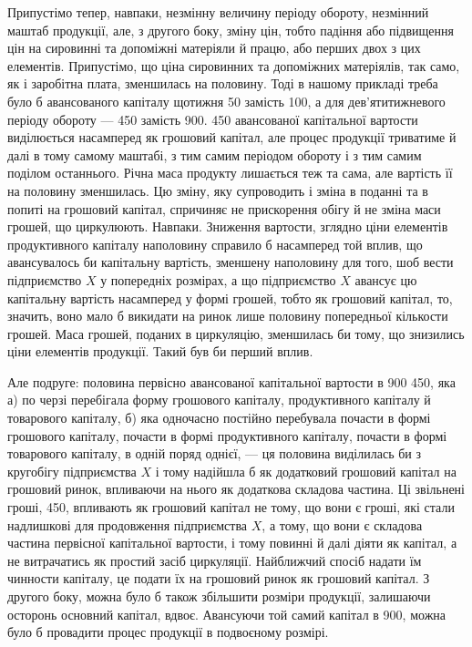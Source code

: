 \parcont{}  %
Припустімо тепер, навпаки, незмінну величину періоду обороту, незмінний
маштаб продукції, але, з другого боку, зміну цін, тобто падіння або
підвищення цін на сировинні та допоміжні матеріяли й працю, або перших
двох з цих елементів. Припустімо, що ціна сировинних та допоміжних
матеріялів, так само, як і заробітна плата, зменшилась на половину.
Тоді в нашому прикладі треба було б авансованого капіталу щотижня
50 замість 100, а для дев'ятитижневого періоду обороту — 450 замість 900. 450 авансованої капітальної
вартости виділюється насамперед як грошовий капітал, але процес продукції
триватиме й далі в тому самому маштабі, з тим самим періодом
обороту і з тим самим поділом останнього. Річна маса продукту лишається
теж та сама, але вартість її на половину зменшилась. Цю зміну, яку
супроводить і зміна в поданні та в попиті на грошовий капітал, спричиняє
не прискорення обігу й не зміна маси грошей, що циркулюють. Навпаки.
Зниження вартости, зглядно ціни елементів продуктивного капіталу
наполовину справило б насамперед той вплив, що авансувалось би капітальну
вартість, зменшену наполовину для того, шоб вести підприємство
$X$ у попередніх розмірах, а що підприємство $X$ авансує цю капітальну
вартість насамперед у формі грошей, тобто як грошовий капітал,
то, значить, воно мало б викидати на ринок лише половину попередньої
кількости грошей. Маса грошей, поданих в циркуляцію, зменшилась би
тому, що знизились ціни елементів продукції. Такий був би перший вплив.

Але подруге: половина первісно авансованої капітальної вартости в
900 \deq{} 450, яка а) по черзі перебігала форму грошового
капіталу, продуктивного капіталу й товарового капіталу, б) яка одночасно
постійно перебувала почасти в формі грошового капіталу, почасти
в формі продуктивного капіталу, почасти в формі товарового капіталу,
в одній поряд однієї, — ця половина виділилась би з
кругобігу підприємства $X$ і тому надійшла б як додатковий грошовий
капітал на грошовий ринок, впливаючи на нього як додаткова складова
частина. Ці звільнені гроші, 450, впливають як грошовий капітал
не тому, що вони є гроші, які стали надлишкові для продовження
підприємства $X$, а тому, що вони є складова частина первісної капітальної
вартости, і тому повинні й далі діяти як капітал, а не витрачатись як
простий засіб циркуляції. Найближчий спосіб надати їм чинности капіталу,
це подати їх на грошовий ринок як грошовий капітал. З другого боку,
можна було б також збільшити розміри продукції, залишаючи осторонь
основний капітал, вдвоє. Авансуючи той самий капітал в 900, можна було б провадити процес продукції в подвоєному розмірі.

